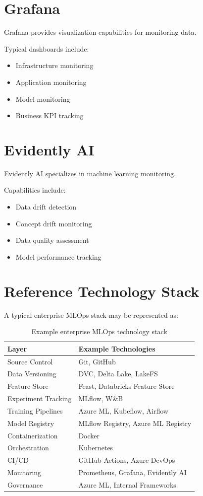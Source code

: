\section{Grafana}

Grafana provides visualization capabilities for monitoring data.

Typical dashboards include:

\begin{itemize}
    \item Infrastructure monitoring
    \item Application monitoring
    \item Model monitoring
    \item Business KPI tracking
\end{itemize}

\section{Evidently AI}

Evidently AI specializes in machine learning monitoring.

Capabilities include:

\begin{itemize}
    \item Data drift detection
    \item Concept drift monitoring
    \item Data quality assessment
    \item Model performance tracking
\end{itemize}

\section{Reference Technology Stack}

A typical enterprise MLOps stack may be represented as:

\begin{table}[h]
\centering
\begin{tabular}{p{4cm}p{8cm}}
\toprule
Layer & Example Technologies \\
\midrule
Source Control & Git, GitHub \\
Data Versioning & DVC, Delta Lake, LakeFS \\
Feature Store & Feast, Databricks Feature Store \\
Experiment Tracking & MLflow, W\&B \\
Training Pipelines & Azure ML, Kubeflow, Airflow \\
Model Registry & MLflow Registry, Azure ML Registry \\
Containerization & Docker \\
Orchestration & Kubernetes \\
CI/CD & GitHub Actions, Azure DevOps \\
Monitoring & Prometheus, Grafana, Evidently AI \\
Governance & Azure ML, Internal Frameworks \\
\bottomrule
\end{tabular}
\caption{Example enterprise MLOps technology stack}
\end{table}

